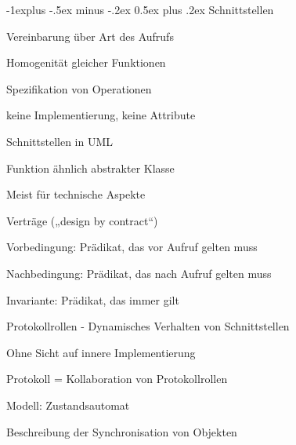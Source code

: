 \documentclass[a4paper]{article}
\makeatletter
\renewcommand{\subsection}{\@startsection{subsection}{2}{0mm}%
                                {-1explus -.5ex minus -.2ex}%
                                {0.5ex plus .2ex}%
                                {\normalfont\normalsize\bfseries}}
\makeatother
\begin{document}
\begin{multicols}{3}
  \subsection{Schnittstellen}
  \begin{itemize*}
    \item Vereinbarung über Art des Aufrufs
    \begin{itemize*}
      \item Homogenität gleicher Funktionen
      \item Spezifikation von Operationen
      \item keine Implementierung, keine Attribute
    \end{itemize*}
    \item Schnittstellen in UML
    \begin{itemize*}
      \item Funktion ähnlich abstrakter Klasse
      \item Meist für technische Aspekte
    \end{itemize*}
    \item Verträge („design by contract“)
    \begin{itemize*}
      \item Vorbedingung: Prädikat, das vor Aufruf gelten muss
      \item Nachbedingung: Prädikat, das nach Aufruf gelten muss
      \item Invariante: Prädikat, das immer gilt
    \end{itemize*}
  \end{itemize*}

  Protokollrollen - Dynamisches Verhalten von Schnittstellen
  \begin{itemize*}
    \item Ohne Sicht auf innere Implementierung
    \item Protokoll = Kollaboration von Protokollrollen
    \item Modell: Zustandsautomat
    \item Beschreibung der Synchronisation von Objekten
  \end{itemize*}


\end{multicols}
\end{document}
